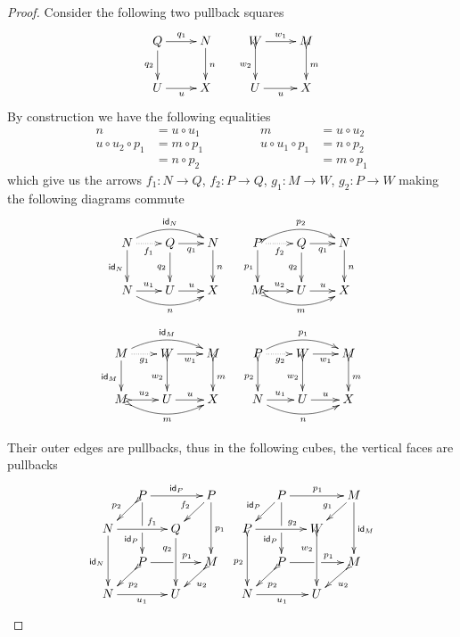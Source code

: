 \documentclass[a4paper]{article}
\newcommand{\id}[1]{\mathsf{id}_{#1}}
\theoremstyle{definition}
\begin{document}
\begin{proof}
	Consider the following two pullback squares
	\[\xymatrix{Q \ar[r]^{q_1} \ar[d]_{q_2} & N\ar[d]^{n} & W \ar[r]^{w_1} \ar@{>->}[d]_{w_2}& M\ar@{>->}[d]^{m}\\
		U \ar[r]_{u}& X & U \ar[r]_{u}& X}\]
	By construction we have the following equalities 
	\[\begin{split}
		n&=u\circ u_1  \qquad \\
		u\circ u_2 \circ p_1&=m\circ p_1\\&=n\circ p_2
	\end{split}\qquad \begin{split}
		m&=u\circ u_2\\ u\circ u_1\circ p_1&=n\circ p_2\\&=m\circ p_1
	\end{split}\]
	which give us the arrows $f_1\colon N\to Q$, $f_2\colon P\to Q$, $g_1\colon M\to W$, $g_2\colon P\to W$ making the following diagrams commute
	\[\xymatrix@C=20pt{N\ar@/^.4cm/[rr]^{\id{N}}\ar@{.>}[r]_{f_1}  \ar[d]_{\id{N}} &Q\ar[r]_{q_1} \ar[d]_{q_2} & N \ar[d]^{n}  &P\ar@{>->}@/^.4cm/[rr]^{p_2}\ar@{.>}[r]_{f_2}  \ar[d]_{p_1} &Q\ar[r]_{q_1} \ar[d]_{q_2} & N \ar[d]^{n}
		\\ N \ar@/_.4cm/[rr]_{n}\ar[r]^{u_1} & U \ar[r]^{u}  & X  & M\ar@{>->}@/_.4cm/[rr]_{m}\ar@{>->}[r]^{u_2}   &U\ar[r]^{u}  & X }\]
	\[\xymatrix@C=20pt{M\ar@/^.4cm/[rr]^{\id{M}}\ar@{.>}[r]_{g_1}  \ar[d]_{\id{M}} &W\ar[r]_{w_1} \ar@{>->}[d]_{w_2} & M \ar@{>->}[d]^{m} & P\ar@/^.4cm/[rr]^{p_1}\ar@{.>}[r]_{g_2}  \ar@{>->}[d]_{p_2} &W\ar[r]_{w_1} \ar@{>->}[d]_{w_2} & M \ar@{>->}[d]^{m}
		\\ M \ar@{>->}@/_.4cm/[rr]_{m}\ar@{>->}[r]^{u_2} & U \ar[r]^{u}  & X & N\ar@/_.4cm/[rr]_{n}\ar[r]^{u_1}  &U\ar[r]^{u} & X }\]	
		
	Their outer edges are pullbacks, thus in the following cubes, the vertical faces are pullbacks
	\[\xymatrix@C=13pt@R=13pt{&P\ar[dd]|\hole_(.65){\id{P}}\ar[rr]^{\id{P}} \ar@{>->}[dl]_{p_2} && P \ar[dd]^{p_1} \ar[dl]_{f_2} & & P\ar[dd]|\hole_(.65){\id{P}}\ar[rr]^{p_1} \ar[dl]_{\id{P}} && M \ar[dd]^{\id{M}} \ar[dl]_{g_1}\\ N  \ar[dd]_{\id{N}}\ar[rr]^(.65){f_1} & & Q \ar[dd]_(.3){q_2}&& P  \ar@{>->}[dd]_{p_2}\ar[rr]^(.65){g_2} & & W \ar@{>->}[dd]_(.3){w_2}\\&P\ar[rr]|\hole^(.65){p_1} \ar@{>->}[dl]^{p_2} && M \ar@{>->}[dl]^{u_2} && P\ar[rr]|\hole^(.65){p_1} \ar@{>->}[dl]^{p_2} && M \ar@{>->}[dl]^{u_2}\\N \ar[rr]_{u_1} & & U && N \ar[rr]_{u_1} & & U}\]


\end{proof}
\end{document}
